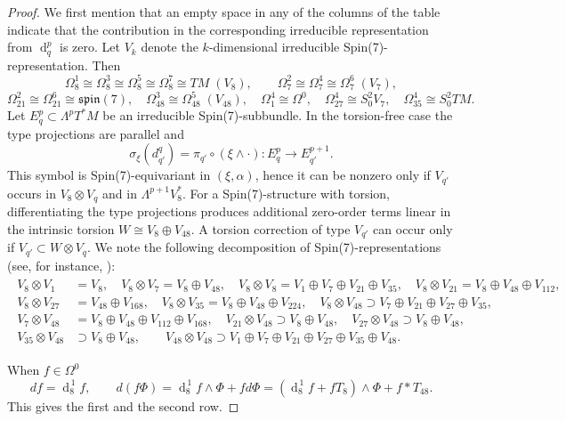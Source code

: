 \documentclass[10pt,a4paper,reqno]{article}
\theoremstyle{definition}
\numberwithin{equation}{section}
\DeclareMathOperator{\dd}{d}
\begin{document}
\begin{proof}
We first mention that an empty space in any of the columns of the table indicate that the contribution in the corresponding irreducible representation from $\dd^p_q$ is zero. Let $V_k$ denote the $k$-dimensional irreducible Spin(7)-representation. Then 
$$
\Omega^1_8\cong\Omega^3_8\cong\Omega^5_8\cong\Omega^7_8\cong TM\;(V_8),\qquad
\Omega^2_7\cong\Omega^4_7\cong\Omega^6_7\;(V_7),$$$$
\Omega^2_{21}\cong\Omega^6_{21}\cong\mathfrak{spin}(7),\quad
\Omega^3_{48}\cong\Omega^5_{48}\;(V_{48}),\quad
\Omega^4_1\cong\Omega^0,\quad
\Omega^4_{27}\cong S^2_0V_7,\quad
\Omega^4_{35}\cong S^2_0TM .
$$
Let \(E_q^p\subset\Lambda^pT^*M\) be an irreducible Spin(7)-subbundle. In the torsion-free case the type projections are parallel and
\[
\sigma_\xi(d_{q'}^q)=\pi_{q'}\circ(\xi\wedge\cdot):E_q^p\longrightarrow E_{q'}^{p+1}.
\] This symbol is Spin(7)-equivariant in \((\xi,\alpha)\), hence it can
be nonzero only if \(V_{q'}\) occurs in \(V_8\otimes V_q\) and in
\(\Lambda^{p+1}V_8^*\). For a Spin(7)-structure with torsion,
differentiating the type projections produces additional zero-order
terms linear in the intrinsic torsion \(W\cong V_8\oplus V_{48}\). A
torsion correction of type \(V_{q'}\) can occur only if
\(V_{q'}\subset W\otimes V_q\). We note the following decomposition of Spin(7)-representations (see, for instance, \cite[]{Spin7-flow_Dwivedi}): 
\begin{align}\label{eq:repdecomp}
\begin{split}
    V_8\!\otimes\!V_1&=V_8,\quad V_8\!\otimes\!V_7=V_8\oplus V_{48},\quad V_8\!\otimes\!V_8=V_1\oplus V_7\oplus V_{21}\oplus V_{35}, \quad V_8\!\otimes\!V_{21}=V_8\oplus V_{48}\oplus V_{112},\\
    V_8\otimes V_{27}&=V_{48}\oplus V_{168}, \quad V_8 \otimes V_{35} = V_8 \oplus V_{48} \oplus V_{224},\quad
V_8\!\otimes\!V_{48}\supset V_7\oplus V_{21}\oplus V_{27}\oplus V_{35}, \\
    V_7 \otimes V_{48} &= V_8 \oplus V_{48} \oplus V_{112} \oplus V_{168},  \quad V_{21} \otimes V_{48} \supset V_8 \oplus V_{48}, \quad
V_{27} \otimes V_{48} \supset V_8 \oplus V_{48}, \\ V_{35} \otimes V_{48} &\supset V_8 \oplus V_{48}, \qquad V_{48} \otimes V_{48} \supset V_1 \oplus V_7 \oplus V_{21} \oplus V_{27} \oplus V_{35} \oplus V_{48}.
\end{split}
\end{align}



When $f \in \Omega^0$
\[
d f = \dd_8^{\,1} f, \qquad
d(f\Phi) = \dd_8^{\,1} f \wedge \Phi +f d\Phi =  (\dd_8^{\,1} f+fT_8) \wedge \Phi + f*T_{48} .
\]This gives the first and the second row.


\end{proof}
\end{document}
